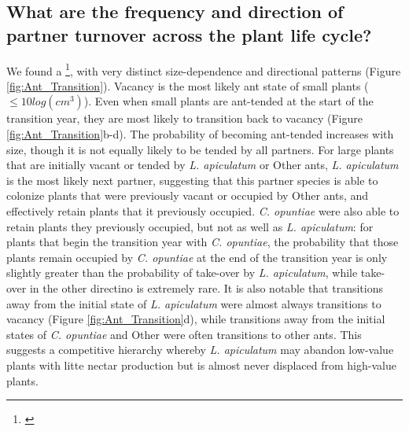 \documentclass[11pt]{article}
\newcommand{\tom}[2]{{\color{red}{#1}}\footnote{\textit{\color{red}{#2}}}}
\begin{document}
\subsection*{What are the frequency and direction of partner turnover across the plant life cycle?}
We found a \tom{high frequency of partner turnover across transition years}{could we estimate the global average turnover rate? Across all observed transitions, what fraction of plants switched ant states. I think that would be a good place to begin, then unpacking that into the effects of initial size and ants.}, with very distinct size-dependence and directional patterns (Figure \ref{fig:Ant_Transition}). 
Vacancy is the most likely ant state of small plants ($\leq 10 log(cm^3)$).
Even when small plants are ant-tended at the start of the transition year, they are most likely to transition back to vacancy (Figure \ref{fig:Ant_Transition}b-d). 
The probability of becoming ant-tended increases with size, though it is not equally likely to be tended by all partners. 
For large plants that are initially vacant or tended by \textit{L. apiculatum} or Other ants, \textit{L. apiculatum} is the most likely next partner, suggesting that this partner species is able to colonize plants that were previously vacant or occupied by Other ants, and effectively retain plants that it previously occupied.  
\textit{C. opuntiae} were also able to retain plants they previously occupied, but not as well as \textit{L. apiculatum}: for plants that begin the transition year with \textit{C. opuntiae}, the probability that those plants remain occupied by \textit{C. opuntiae} at the end of the transition year is only slightly greater than the probability of take-over by \textit{L. apiculatum}, while take-over in the other directino is extremely rare. 
It is also notable that transitions away from the initial state of  \textit{L. apiculatum} were almost always transitions to vacancy (Figure \ref{fig:Ant_Transition}d), while transitions away from the initial states of \textit{C. opuntiae} and Other  were often transitions to other ants. 
This suggests a competitive hierarchy whereby \textit{L. apiculatum} may abandon low-value plants with litte nectar production but is almost never displaced from high-value plants. 
\end{document}
